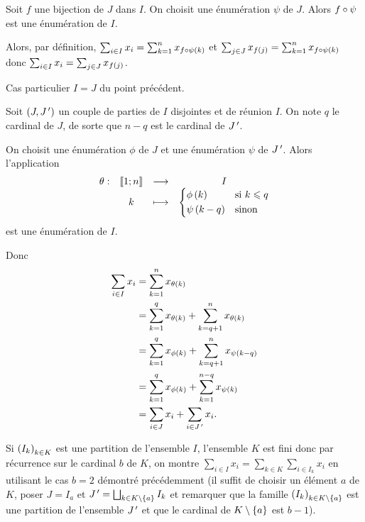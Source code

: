 \begin{dem}[1]
Soit \(f\) une bijection de \(J\) dans \(I\). On choisit une énumération \(\psi\) de \(J\). Alors \(f\circ\psi\) est une énumération de \(I\).

Alors, par définition, \(\sum_{i\in I}x_i=\sum_{k=1}^nx_{f\circ\psi\left(k\right)}\) et \(\sum_{j\in J}x_{f\left(j\right)}=\sum_{k=1}^{n}x_{f\circ\psi\left(k\right)}\) donc \(\sum_{i\in I}x_i=\sum_{j\in J}x_{f\left(j\right)}\).
\end{dem}

\begin{dem}[2]
Cas particulier \(I=J\) du point précédent.
\end{dem}

\begin{dem}[3]
Soit \(\left(J,J^{\,\prime}\right)\) un couple de parties de \(I\) disjointes et de réunion \(I\). On note \(q\) le cardinal de \(J\), de sorte que \(n-q\) est le cardinal de \(J^{\,\prime}\).

On choisit une énumération \(\phi\) de \(J\) et une énumération \(\psi\) de \(J^{\,\prime}\). Alors l'application \[\begin{array}[t]{cccc}\theta : & \left\llbracket1;n\right\rrbracket & \longrightarrow & I \\ & k & \longmapsto & \begin{dcases}
\phi\left(k\right) &\text{si }k\leqslant q \\
\psi\left(k-q\right) &\text{sinon}
\end{dcases}\end{array}\] est une énumération de \(I\).

Donc \[\begin{aligned}
\sum_{i\in I}x_i&=\sum_{k=1}^nx_{\theta\left(k\right)} \\
&=\sum_{k=1}^qx_{\theta\left(k\right)}+\sum_{k=q+1}^nx_{\theta\left(k\right)} \\
&=\sum_{k=1}^qx_{\phi\left(k\right)}+\sum_{k=q+1}^nx_{\psi\left(k-q\right)} \\
&=\sum_{k=1}^qx_{\phi\left(k\right)}+\sum_{k=1}^{n-q}x_{\psi\left(k\right)} \\
&=\sum_{i\in J}x_i+\sum_{i\in J^{\,\prime}}x_i.
\end{aligned}\]
\end{dem}

\begin{dem}[4]
Si \(\left(I_k\right)_{k\in K}\) est une partition de l'ensemble \(I\), l'ensemble \(K\) est fini donc par récurrence sur le cardinal \(b\) de \(K\), on montre \(\sum_{i\in I}x_i=\sum_{k\in K}\sum_{i\in I_k}x_i\) en utilisant le cas \(b=2\) démontré précédemment (il suffit de choisir un élément \(a\) de \(K\), poser \(J=I_a\) et \(J^{\,\prime}=\bigsqcup_{k\in K\setminus\left\lbrace a\right\rbrace}I_k\) et remarquer que la famille \(\left(I_k\right)_{k\in K\setminus\left\lbrace a\right\rbrace}\) est une partition de l'ensemble \(J^{\,\prime}\) et que le cardinal de \(K\setminus\left\lbrace a\right\rbrace\) est \(b-1\)).
\end{dem}

